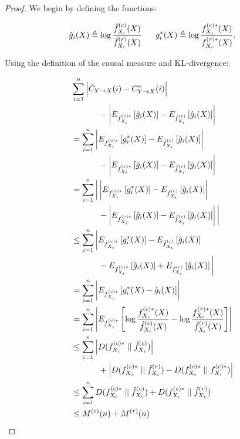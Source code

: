 \begin{proof}
We begin by defining the functions:

\begin{equation}
\hat{g}_i(X) \triangleq \log \frac{\hat{f}_{X_i}^{(c)}(X)}{\hat{f}_{X_i}^{(r)}(X)} \ \ \ \ \
g^*_i(X) \triangleq \log \frac{f_{X_i}^{(c)*}(X)}{f_{X_i}^{(r)*}(X)}.
\end{equation}

\noindent Using the definition of the causal measure and KL-divergence:

\begin{align}
&\sum_{i=1}^n \left| \estcyx(i) - \optcyx(i) \right|
\nonumber \\
& \ \ \ \ \ \ \ \ \ \ - \left|
E_{\optfxc{i}}\left[ \hat{g}_i(X)\right] -
E_{\estfxc{i}}\left[ \hat{g}_i(X)\right]
\right| \label{beginning} \\
&= \sum_{i=1}^n
\left|
E_{\optfxc{i}}\left[ g^*_i(X)\right] -
E_{\estfxc{i}}\left[ \hat{g}_i(X)\right]
\right| \nonumber \\
& \ \ \ \ \ \ \ \ \ \ - \left|
E_{\optfxc{i}}\left[ \hat{g}_i(X)\right] -
E_{\estfxc{i}}\left[ \hat{g}_i(X)\right]
\right| \\
&= \sum_{i=1}^n
\bigg| \left|
E_{\optfxc{i}}\left[ g^*_i(X)\right] -
E_{\estfxc{i}}\left[ \hat{g}_i(X)\right]
\right| \nonumber \\
& \ \ \ \ \ \ \ \ \ \ - \left|
E_{\optfxc{i}}\left[ \hat{g}_i(X)\right] -
E_{\estfxc{i}}\left[ \hat{g}_i(X)\right]
\right| \bigg| \\
&\le \sum_{i=1}^n
\bigg|
E_{\optfxc{i}}\left[ g^*_i(X)\right] -
E_{\estfxc{i}}\left[ \hat{g}_i(X)\right] \nonumber \\
& \ \ \ \ \ \ \ \ \ \ -
E_{\optfxc{i}}\left[ \hat{g}_i(X)\right] +
E_{\estfxc{i}}\left[ \hat{g}_i(X)\right] \bigg| \label{rev_tri} \\
&= \sum_{i=1}^n \left|
E_{\optfxc{i}}\left[ g^*_i(X) - \hat{g}_i(X)\right] \right| \\
&= \sum_{i=1}^n \left|
E_{\optfxc{i}}\left[
\log \frac{\optfxc{i}(X)}{\estfxc{i}(X)}
- \log \frac{\optfxr{i}(X)}{\estfxr{i}(X)}
\right] \right| \\
&\le \sum_{i=1}^n \left|
\kl{\optfxc{i}}{\estfxc{i}} \right| \nonumber \\
& \ \ \ \ \ \ \ \ \ \ +
\left|
\kl{\optfxc{i}}{\estfxr{i}} -
\kl{\optfxc{i}}{\optfxr{i}}
\right| \label{tri} \\
&\le \sum_{i=1}^n
\kl{\optfxc{i}}{\estfxc{i}} +
\kl{\optfxc{i}}{\estfxr{i}} \label{assumption2} \\
&\le M^{(c)}(n) + M^{(r)}(n) \label{regretlemma}
\end{align}


\end{proof}
